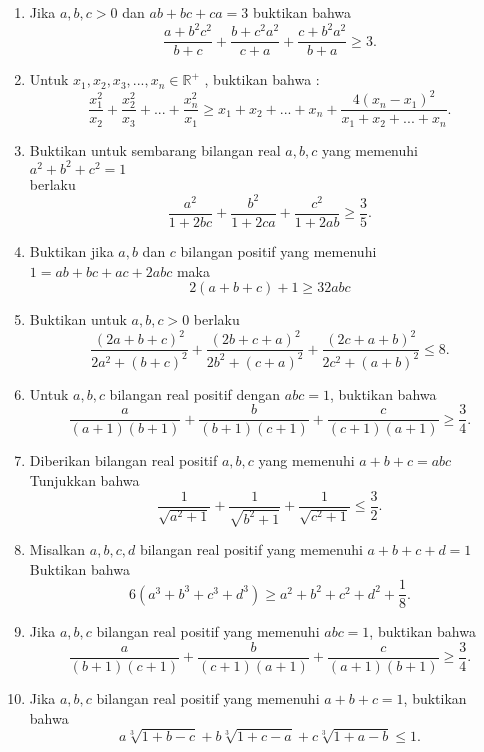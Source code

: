 \documentclass[11pt]{scrartcl}
\begin{document}
\begin{enumerate}
\item Jika $a,b,c>0$ dan \(ab+bc+ca=3\) buktikan bahwa \\
\[\frac{a+b^{2}c^{2}}{b+c}+\frac{b+c^{2}a^{2}}{c+a}+\frac{c+b^{2}a^{2}}{b+a}\ge3.\]

\item Untuk \(x_{1},x_{2},x_{3},...,x_{n}\in\mathbb{R}^{+}\) , buktikan bahwa : \\
\[\frac{x_{1}^{2}}{x_{2}}+\frac{x_{2}^{2}}{x_{3}}+...+\frac{x_{n}^{2}}{x_{1}}\ge x_{1}+x_{2}+...+x_{n}+\frac{4(x_{n}-x_{1})^{2}}{x_{1}+x_{2}+...+x_{n}}.\]

\item Buktikan untuk sembarang bilangan real $a, b, c$ yang memenuhi \(a^{2}+b^{2}+c^{2}=1\) \\
berlaku \\
\[\frac{a^{2}}{1+2bc}+\frac{b^{2}}{1+2ca}+\frac{c^{2}}{1+2ab}\ge\frac{3}{5}.\]

\item Buktikan jika $a, b$ dan $c$ bilangan positif yang memenuhi $1 = ab+bc+ac+2abc$ maka
$$2(a+b+c)+1\ge32abc$$

\item Buktikan untuk \(a, b,c>0\) berlaku \\
\[\frac{(2a+b+c)^{2}}{2a^{2}+(b+c)^{2}}+\frac{(2b+c+a)^{2}}{2b^{2}+(c+a)^{2}}+\frac{(2c+a+b)^{2}}{2c^{2}+(a+b)^{2}}\le8.\]

\item Untuk $a, b, c$ bilangan real positif dengan $abc = 1$, buktikan bahwa \\
\[\frac{a}{(a+1)(b+1)}+\frac{b}{(b+1)(c+1)}+\frac{c}{(c+1)(a+1)}\ge\frac{3}{4}.\]

\item Diberikan bilangan real positif $a, b, c$ yang memenuhi $a+b+c=abc$ 
Tunjukkan bahwa
\[\frac{1}{\sqrt{a^{2}+1}}+\frac{1}{\sqrt{b^{2}+1}}+\frac{1}{\sqrt{c^{2}+1}}\le\frac{3}{2}.\]

\item Misalkan $a, b, c, d$ bilangan real positif yang memenuhi $a+b+c+d=1$ 
Buktikan bahwa
\[6(a^{3}+b^{3}+c^{3}+d^{3})\ge a^{2}+b^{2}+c^{2}+d^{2}+\frac{1}{8}.\]

\item Jika $a, b, c$ bilangan real positif yang memenuhi $abc = 1$, buktikan bahwa
\[\frac{a}{(b+1)(c+1)}+\frac{b}{(c+1)(a+1)}+\frac{c}{(a+1)(b+1)}\ge\frac{3}{4}.\]

\item Jika $a, b, c$ bilangan real positif yang memenuhi $a+b+c=1$, buktikan bahwa
\[a\sqrt[3]{1+b-c}+b\sqrt[3]{1+c-a}+c\sqrt[3]{1+a-b}\le1.\]


\end{enumerate}
\end{document}
